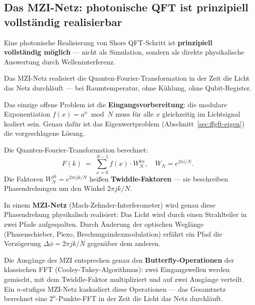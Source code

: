 \subsection{Das MZI-Netz: photonische QFT ist prinzipiell vollständig realisierbar}
\label{sec:mzi-qft}

\begin{keypoint}
Eine photonische Realisierung von Shors QFT-Schritt
ist \textbf{prinzipiell vollständig möglich} ---
nicht als Simulation, sondern als direkte physikalische
Auswertung durch Welleninterferenz.

Das MZI-Netz realisiert die Quanten-Fourier-Transformation
in der Zeit die Licht das Netz durchläuft ---
bei Raumtemperatur, ohne Kühlung, ohne Qubit-Register.

Das einzige offene Problem ist die \textbf{Eingangsvorbereitung}:
die modulare Exponentiation $f(x) = a^x \bmod N$
muss für alle $x$ gleichzeitig im Lichtsignal kodiert sein.
Genau dafür ist das Eigenwertproblem (Abschnitt~\ref{sec:ffgft-eigen})
die vorgeschlagene Lösung.
\end{keypoint}


Die Quanten-Fourier-Transformation berechnet:
\begin{equation}
  F(k) \;=\; \sum_{x=0}^{N-1} f(x)\cdot W_N^{kx},
  \quad W_N = e^{2\pi i/N}.
\end{equation}
Die Faktoren $W_N^{jk} = e^{2\pi i jk/N}$ heißen
\textbf{Twiddle-Faktoren} --- sie beschreiben
Phasendrehungen um den Winkel $2\pi jk/N$.

In einem \textbf{MZI-Netz} (Mach-Zehnder-Interferometer)
wird genau diese Phasendrehung physikalisch realisiert:
Das Licht wird durch einen Strahlteiler in zwei Pfade
aufgespalten. Durch Änderung der optischen Weglänge
(Phasenschieber, Piezo, Brechungsindexmodulation)
erfährt ein Pfad die Verzögerung $\Delta\phi = 2\pi jk/N$
gegenüber dem anderen.

Die Ausgänge des MZI entsprechen genau den
\textbf{Butterfly-Operationen} der klassischen FFT
(Cooley-Tukey-Algorithmus): zwei Eingangswellen werden
gemischt, mit dem Twiddle-Faktor multipliziert und
auf zwei Ausgänge verteilt. Ein $n$-stufiges MZI-Netz
kaskadiert diese Operationen --- das Gesamtnetz
berechnet eine $2^n$-Punkte-FFT in der Zeit die
Licht das Netz durchläuft.

